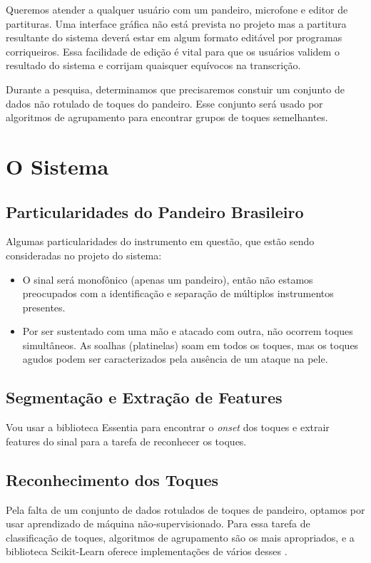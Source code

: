 \documentclass[
  dissertacao,
  brazil
]{ThesisPUC}
\begin{document}
Queremos atender a qualquer usuário com um pandeiro, microfone e editor de partituras. Uma interface gráfica não está prevista no projeto mas a partitura resultante do sistema deverá estar em algum formato editável por programas corriqueiros. Essa facilidade de edição é vital para que os usuários validem o resultado do sistema e corrijam quaisquer equívocos na transcrição.

Durante a pesquisa, determinamos que precisaremos constuir um conjunto de dados não rotulado de toques do pandeiro. Esse conjunto será usado por algoritmos de agrupamento para encontrar grupos de toques semelhantes.

\section{O Sistema}
\subsection{Particularidades do Pandeiro Brasileiro}
Algumas particularidades do instrumento em questão, que estão sendo consideradas no projeto do sistema: 
\begin{itemize}
    \item O sinal será monofônico (apenas um pandeiro), então não estamos preocupados com a identificação e separação de múltiplos instrumentos presentes.
    \item Por ser sustentado com uma mão e atacado com outra, não ocorrem toques simultâneos. As soalhas (platinelas) soam em todos os toques, mas os toques agudos podem ser caracterizados pela ausência de um ataque na pele.
\end{itemize}

\subsection{Segmentação e Extração de Features }
Vou usar a biblioteca Essentia para encontrar o \emph{onset} dos toques e extrair features do sinal para a tarefa de reconhecer os toques.

\subsection{Reconhecimento dos Toques}
Pela falta de um conjunto de dados rotulados de toques de pandeiro, optamos por usar aprendizado de máquina não-supervisionado. Para essa tarefa de classificação de toques, algoritmos de agrupamento são os mais apropriados, e a biblioteca Scikit-Learn oferece implementações de vários desses \cite{scikit2019Clustering}.
\end{document}
